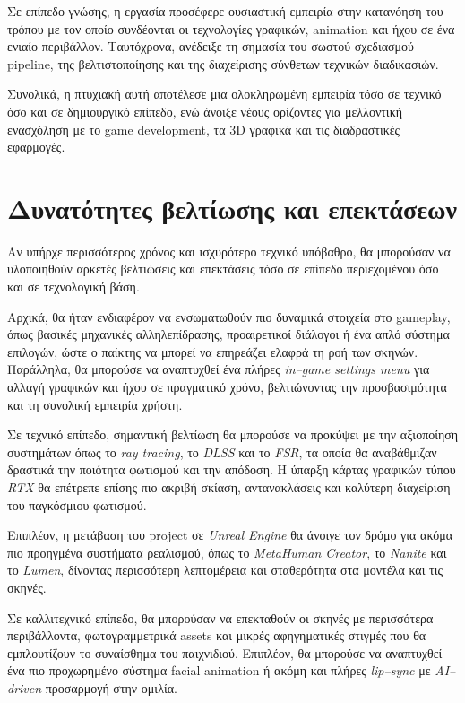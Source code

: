 Σε επίπεδο γνώσης, η εργασία προσέφερε ουσιαστική εμπειρία 
στην κατανόηση του τρόπου με τον οποίο συνδέονται 
οι τεχνολογίες γραφικών, animation και ήχου σε ένα ενιαίο περιβάλλον. 
Ταυτόχρονα, ανέδειξε τη σημασία του σωστού σχεδιασμού pipeline, 
της βελτιστοποίησης και της διαχείρισης σύνθετων τεχνικών διαδικασιών. 

Συνολικά, η πτυχιακή αυτή αποτέλεσε μια ολοκληρωμένη εμπειρία 
τόσο σε τεχνικό όσο και σε δημιουργικό επίπεδο, 
ενώ άνοιξε νέους ορίζοντες για μελλοντική ενασχόληση 
με το game development, τα 3D γραφικά και τις διαδραστικές εφαρμογές.
\section{Δυνατότητες βελτίωσης και επεκτάσεων}
Αν υπήρχε περισσότερος χρόνος και ισχυρότερο τεχνικό υπόβαθρο, 
θα μπορούσαν να υλοποιηθούν αρκετές βελτιώσεις και επεκτάσεις 
τόσο σε επίπεδο περιεχομένου όσο και σε τεχνολογική βάση.

Αρχικά, θα ήταν ενδιαφέρον να ενσωματωθούν πιο δυναμικά στοιχεία 
στο gameplay, όπως βασικές μηχανικές αλληλεπίδρασης, 
προαιρετικοί διάλογοι ή ένα απλό σύστημα επιλογών, 
ώστε ο παίκτης να μπορεί να επηρεάζει ελαφρά τη ροή των σκηνών. 
Παράλληλα, θα μπορούσε να αναπτυχθεί ένα πλήρες 
\textit{in–game settings menu} για αλλαγή γραφικών και ήχου σε πραγματικό χρόνο, 
βελτιώνοντας την προσβασιμότητα και τη συνολική εμπειρία χρήστη.

Σε τεχνικό επίπεδο, σημαντική βελτίωση θα μπορούσε να προκύψει 
με την αξιοποίηση συστημάτων όπως το \textit{ray tracing}, 
το \textit{DLSS} και το \textit{FSR}, 
τα οποία θα αναβάθμιζαν δραστικά την ποιότητα φωτισμού και την απόδοση. 
Η ύπαρξη κάρτας γραφικών τύπου \textit{RTX} 
θα επέτρεπε επίσης πιο ακριβή σκίαση, 
αντανακλάσεις και καλύτερη διαχείριση του παγκόσμιου φωτισμού.  

Επιπλέον, η μετάβαση του project σε \textit{Unreal Engine} 
θα άνοιγε τον δρόμο για ακόμα πιο προηγμένα συστήματα ρεαλισμού, 
όπως το \textit{MetaHuman Creator}, το \textit{Nanite} και το \textit{Lumen}, 
δίνοντας περισσότερη λεπτομέρεια και σταθερότητα στα μοντέλα και τις σκηνές.

Σε καλλιτεχνικό επίπεδο, θα μπορούσαν να επεκταθούν οι σκηνές 
με περισσότερα περιβάλλοντα, φωτογραμμετρικά assets 
και μικρές αφηγηματικές στιγμές που θα εμπλουτίζουν το συναίσθημα του παιχνιδιού. 
Επιπλέον, θα μπορούσε να αναπτυχθεί ένα πιο προχωρημένο 
σύστημα facial animation ή ακόμη και πλήρες \textit{lip–sync} 
με \textit{AI–driven} προσαρμογή στην ομιλία.

